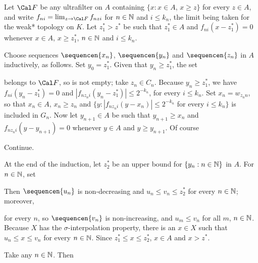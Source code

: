 {

\noindent Let $\Cal F$ be any ultrafilter on $A$ containing
$\{x:x\in A$, $x\ge z\}$ for every $z\in A$, and write
$f_{ni}=\lim_{z\to\Cal F}f_{nzi}$ for $n\in\Bbb N$ and $i\le k_n$, the
limit being taken for the weak* topology on $K$.   Let $z_1^*>z^*$ be
such that $z_1^*\in A$ and $f_{ni}(x-z_1^*)=0$ whenever $x\in A$,
$x\ge z_1^*$, $n\in\Bbb N$ and $i\le k_n$.

Choose sequences $\sequencen{x_n}$, $\sequencen{y_n}$ and
$\sequencen{z_n}$ in $A$ inductively, as follows.   Set $y_0=z_1^*$.
Given that $y_n\ge z_1^*$, the set


\noindent belongs to $\Cal F$, so is not empty;  take $z_n\in C_n$.
Because $y_n\ge z_1^*$, we have $f_{ni}(y_n-z_1^*)=0$ and
$|f_{nz_ni}(y_n-z_1^*)|\le 2^{-k_n}$, for every $i\le k_n$.
Set $x_n=w_{z_nn}$, so that $x_n\in A$, $x_n\ge z_n$ and
$\{y:|f_{nz_ni}(y-x_n)|\le 2^{-k_n}$ for every $i\le k_n\}$ is included in
$G_n$.   Now let $y_{n+1}\in A$ be such that
$y_{n+1}\ge x_n$ and $f_{nz_ni}(y-y_{n+1})=0$ whenever $y\in A$ and
$y\ge y_{n+1}$.   Of course


\noindent Continue.

At the end of the induction, let $z_2^*$ be an upper bound for
$\{y_n:n\in\Bbb N\}$ in $A$.   For $n\in\Bbb N$, set


\noindent Then $\sequencen{u_n}$ is non-decreasing and
$u_n\le v_n\le z_2^*$ for every $n\in\Bbb N$;  moreover,


\noindent for every $n$, so $\sequencen{v_n}$ is non-increasing, and
$u_m\le v_n$ for all $m$, $n\in\Bbb N$.   Because $X$ has the
$\sigma$-interpolation property, there is an $x\in X$ such that
$u_n\le x\le v_n$ for every $n\in\Bbb N$.   Since
$z_1^*\le x\le z_2^*$, $x\in A$ and $x>z^*$.

Take any $n\in\Bbb N$.   Then


}
